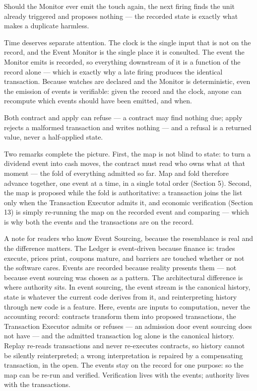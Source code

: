 \documentclass[11pt,a4paper]{article}
\newcommand{\clabel}[1]{\leavevmode\hypertarget{clause-#1}{}%
  \marginpar{\raggedright\scriptsize\ttfamily\textcolor{gray}{#1}}}
\begin{document}
Should the Monitor ever emit the touch again, the next firing finds the
unit already triggered and proposes nothing --- the recorded state is
exactly what makes a duplicate harmless.

Time deserves separate attention. \clabel{C-3.7}The clock is the single input that is
not on the record, and the Event Monitor is the single place it is
consulted. The event the Monitor emits is recorded, so everything
downstream of it is a function of the record alone --- which is exactly
why a late firing produces the identical transaction. Because watches
are declared and the Monitor is deterministic, even the emission of
events is verifiable: given the record and the clock, anyone can
recompute which events should have been emitted, and when.

\clabel{C-3.8}Both contract and apply can refuse --- a contract may find nothing due;
apply rejects a malformed transaction and writes nothing --- and a
refusal is a returned value, never a half-applied state.

Two remarks complete the picture. First, the map is not blind to state:
to turn a dividend event into cash moves, the contract must read who
owns what at that moment --- the fold of everything admitted so far. \clabel{C-3.9}Map
and fold therefore advance together, one event at a time, in a single
total order (Section 5). Second, \clabel{C-3.10}the map is proposed while the fold is
authoritative: a transaction joins the list only when the Transaction
Executor admits it, and economic verification (Section 13) is simply
re-running the map on the recorded event and comparing --- which is why
both the events and the transactions are on the record.

A note for readers who know Event Sourcing, because the resemblance is
real and the difference matters. The Ledger is event-driven because
finance is: trades execute, prices print, coupons mature, and barriers
are touched whether or not the software cares. Events are recorded
because reality presents them --- not because event sourcing was chosen
as a pattern. The architectural difference is where authority sits. In
event sourcing, the event stream is the canonical history, state is
whatever the current code derives from it, and reinterpreting history
through new code is a feature. Here, events are inputs to computation,
never the accounting record: contracts transform them into proposed
transactions, the Transaction Executor admits or refuses --- an
admission door event sourcing does not have --- and the admitted
transaction log alone is the canonical history. \clabel{C-3.11}Replay re-reads
transactions and never re-executes contracts, so history cannot be
silently reinterpreted; a wrong interpretation is repaired by a
compensating transaction, in the open. The events stay on the record for
one purpose: so the map can be re-run and verified. Verification lives
with the events; authority lives with the transactions.
\end{document}
